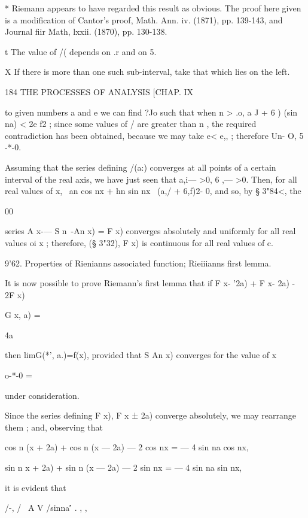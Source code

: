 * Riemann appears to have regarded this result as obvious. The proof here given is a 
modification of Cantor's proof, Math. Ann. iv. (1871), pp. 139-143, and Journal fiir Math, lxxii. 
(1870), pp. 130-138. 

t The value of /(  depends on .r and on 5. 

X If there is more than one such sub-interval, take that which lies on the left. 



184 THE PROCESSES OF ANALYSIS [CHAP. IX 

to given numbers a and e we can find ?Jo such that when n >  .o,  a J + 6  )   (sin na) < 2e  f2 ; 
since some values of  / are greater than n , the required contradiction has been obtained, 
because we may take e< e,, ; therefore Un- O, 5 -*-0. 

Assuming that the series defining /(a:) converges at all points of a certain 
interval of the real axis, we have just seen that a,i— >0, 6 ,— >0. Then, for all 
real values of x, \ an cos nx + hn sin nx \   (a,/ + 6,f)2- 0, and so, by § 3"84<, the 

00 

series  A x-— S n~-An x) = F x) converges absolutely and uniformly for all 
real values oi x ; therefore, (§ 3"32), F x) is continuous for all real values of  c. 

9'62. Properties of Rienianns associated function; Rieiiianns first lemma. 

It is now possible to prove Riemann's first lemma that if 
F x- '2a) + F x- 2a) - 2F  x) 



G  x, a) = 



4a  



then limG(*', a.)=f(x), provided that S An x) converges for the value of x 

o-*-0   = 

under consideration. 

Since the series defining F x), F x ± 2a) converge absolutely, we may 
rearrange them ; and, observing that 

cos n (x + 2a) + cos n (x — 2a) — 2 cos nx = — 4 sin  na cos nx, 

sin n  x + 2a) + sin n (x — 2a) — 2 sin nx = — 4 sin  na sin nx, 

it is evident that 

/-, / \ A V /sinna\''  . , , 


